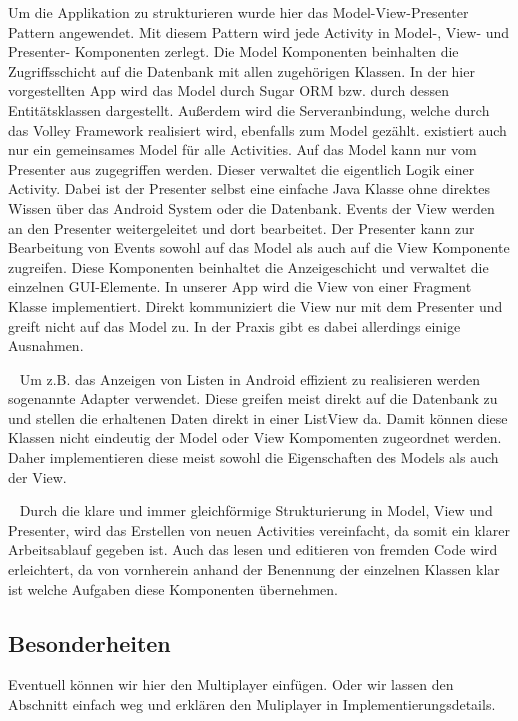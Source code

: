 \documentclass{scrartcl}
\begin{document}
Um die Applikation zu strukturieren wurde hier das Model-View-Presenter Pattern
angewendet. Mit diesem Pattern wird jede Activity in Model-, View- und
Presenter- Komponenten zerlegt. Die Model Komponenten beinhalten die
Zugriffsschicht auf die Datenbank mit allen zugehörigen Klassen. In der hier
vorgestellten App wird das Model durch Sugar ORM bzw. durch dessen
Entitätsklassen dargestellt. Außerdem wird die Serveranbindung, welche durch das
Volley Framework realisiert wird, ebenfalls zum Model gezählt. existiert auch
nur ein gemeinsames Model für alle Activities. Auf das Model kann nur vom
Presenter aus zugegriffen werden. Dieser verwaltet die
eigentlich Logik einer Activity. Dabei ist der Presenter selbst eine einfache
Java Klasse ohne direktes Wissen über das Android System oder die Datenbank.
Events der View werden an den Presenter weitergeleitet und dort bearbeitet. Der
Presenter kann zur Bearbeitung von Events sowohl auf das Model als auch auf die
View Komponente zugreifen. Diese Komponenten beinhaltet die Anzeigeschicht und
verwaltet die einzelnen GUI-Elemente. In unserer App wird die View von einer
Fragment Klasse implementiert. Direkt kommuniziert die View nur mit dem
Presenter und greift nicht auf das Model zu. In der Praxis gibt es dabei
allerdings einige Ausnahmen.

\ \newline
Um z.B. das Anzeigen von Listen in Android
effizient zu realisieren werden sogenannte Adapter verwendet. Diese greifen
meist direkt auf die Datenbank zu und stellen die erhaltenen Daten direkt in
einer ListView da. Damit können diese Klassen nicht eindeutig der Model oder
View Kompomenten zugeordnet werden. Daher implementieren diese meist sowohl die
Eigenschaften des Models als auch der View.

\ \newline
Durch die klare und immer gleichförmige Strukturierung in Model, View und
Presenter, wird das Erstellen von neuen Activities vereinfacht, da somit ein
klarer Arbeitsablauf gegeben ist. Auch das lesen und editieren von fremden Code
wird erleichtert, da von vornherein anhand der Benennung der einzelnen Klassen
klar ist welche Aufgaben diese Komponenten übernehmen.

\subsection{Besonderheiten}

Eventuell können wir hier den Multiplayer einfügen. Oder wir lassen den
Abschnitt einfach weg und erklären den Muliplayer in Implementierungsdetails.
\end{document}
